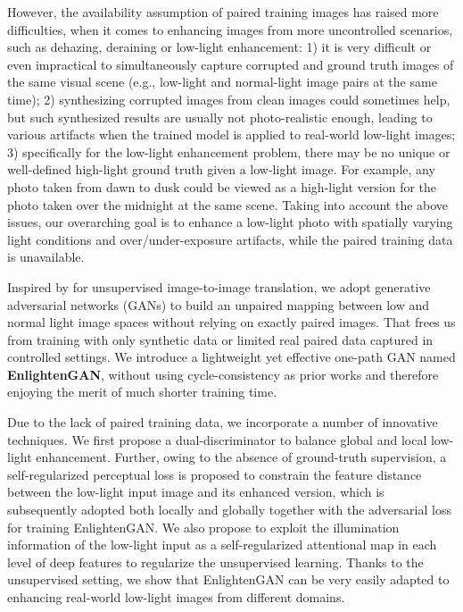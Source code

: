 \documentclass[journal]{IEEEtran}
\begin{document}
However, the availability assumption of paired training images has raised more difficulties, when it comes to enhancing images from more uncontrolled  scenarios, such as dehazing, deraining or low-light enhancement: 1) it is very difficult or even impractical to simultaneously capture corrupted and ground truth images of the same visual scene (e.g., low-light and normal-light image pairs at the same time); 2) synthesizing corrupted images from clean images could sometimes help, but such synthesized results are usually not photo-realistic enough, leading to various artifacts when the trained model is applied to real-world low-light images; 
3) specifically for the low-light enhancement problem, there may be no unique or well-defined high-light ground truth given a low-light image. For example, any photo taken from dawn to dusk could be viewed as a high-light version for the photo taken over the midnight at the same scene. 
Taking into account the above issues, our overarching goal is to enhance a low-light photo with spatially varying light conditions and over/under-exposure artifacts, while the paired training data is unavailable. 















Inspired by \cite{zhu2017unpaired,liu2017unsupervised} for unsupervised image-to-image translation, we adopt generative adversarial networks (GANs) to build an unpaired mapping between low and normal light image spaces without relying on exactly paired images. That frees us from training with only synthetic data or limited real paired data captured in controlled settings. We introduce a lightweight yet effective one-path GAN named \textbf{EnlightenGAN}, without using cycle-consistency as prior works  \cite{madam2018unsupervised, huang2018multimodal, choi2018stargan, hoffman2017cycada} and therefore enjoying the merit of much shorter training time. 


Due to the lack of paired training data, we incorporate a number of innovative techniques. 
We first propose a dual-discriminator to balance global and local low-light enhancement. Further, owing to the absence of ground-truth supervision, a self-regularized perceptual loss is proposed to constrain the feature distance between the low-light input image and its enhanced version, which is subsequently adopted both locally and globally together with the adversarial loss for training EnlightenGAN.
We also propose to exploit the illumination information of the low-light input as a self-regularized attentional map in each level of deep features to regularize the unsupervised learning.
Thanks to the unsupervised setting, we show that EnlightenGAN can be very easily adapted to enhancing real-world low-light images from different domains.
\end{document}
